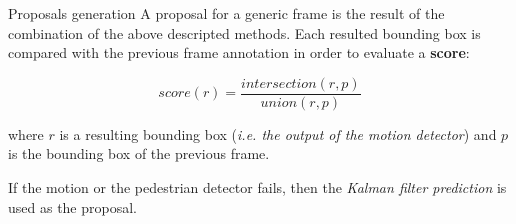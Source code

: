 \documentclass{beamer}
\begin{document}
\begin{tframe}{Proposals generation}
A proposal for a generic frame is the result of the combination of the above descripted methods. Each resulted bounding box is compared with the previous frame annotation in order to evaluate a \textbf{score}:
\vspace{0.2cm}

$$score(r) = \frac{intersection(r, p)}{union(r, p)}$$

\vspace{0.3cm}

where $r$ is a resulting bounding box (\emph{i.e. the output of the motion detector}) and $p$ is the bounding box of the previous frame. 

\vspace{0.3cm}

If the motion or the pedestrian detector fails, then the \emph{Kalman filter prediction} is used as the proposal.
\end{tframe}
\end{document}
